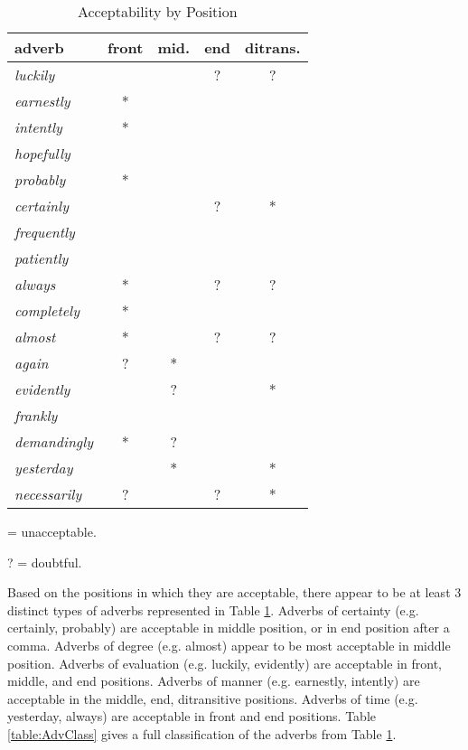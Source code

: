 \documentclass[doc,12pt,natbib]{apa6}
\begin{document}
\begin{table}
\begin{threeparttable}
\begin{tabular}{ l c c c c }
	\toprule
	adverb & front & mid. & end & ditrans. \\
	\midrule
	\textit{luckily} & & & ? & ? \\
	\textit{earnestly} & * & & &  \\
	\textit{intently} & * & & & \\
	\textit{hopefully} & & & & \\
	\textit{probably} & * & & & \\
	\textit{certainly} & & & ? & * \\
	\textit{frequently} & & & & \\
	\textit{patiently} & & & & \\
	\textit{always} & * & & ? & ? \\
	\textit{completely} & * & & & \\
	\textit{almost} & * & & ? & ? \\
	\textit{again} & ? & * & & \\
	\textit{evidently} & & ? & & * \\
	\textit{frankly} & & & & \\
	\textit{demandingly} & * & ? & & \\
	\textit{yesterday} & & * & & * \\
	\textit{necessarily} & ? & & ? & * \\
	\bottomrule
\end{tabular}
\begin{tablenotes}
	\small
	\item * = unacceptable.
	\item ? = doubtful.
\end{tablenotes}
\end{threeparttable}
\caption{Acceptability by Position}
\label{table:AdvPos}
\end{table}

Based on the positions in which they are acceptable, there appear to be at
least 3 distinct types of adverbs represented in Table \ref{table:AdvPos}.
Adverbs of certainty (e.g.  certainly, probably) are acceptable in middle
position, or in end position after a comma.  Adverbs of degree (e.g. almost)
appear to be most acceptable in middle position.  Adverbs of evaluation (e.g.
luckily, evidently) are acceptable in front, middle, and end positions.
Adverbs of manner (e.g. earnestly, intently) are acceptable in the middle, end,
ditransitive positions.  Adverbs of time (e.g. yesterday, always) are
acceptable in front and end positions.  Table \ref{table:AdvClass} gives a full
classification of the adverbs from Table \ref{table:AdvPos}.
\end{document}
